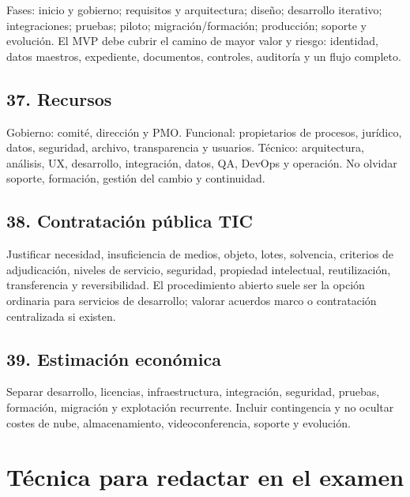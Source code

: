 \documentclass[11pt,a4paper]{article}
\begin{document}
Fases: inicio y gobierno; requisitos y arquitectura; diseño; desarrollo iterativo; integraciones; pruebas; piloto; migración/formación; producción; soporte y evolución. El MVP debe cubrir el camino de mayor valor y riesgo: identidad, datos maestros, expediente, documentos, controles, auditoría y un flujo completo.

\subsection{37. Recursos}

Gobierno: comité, dirección y PMO. Funcional: propietarios de procesos, jurídico, datos, seguridad, archivo, transparencia y usuarios. Técnico: arquitectura, análisis, UX, desarrollo, integración, datos, QA, DevOps y operación. No olvidar soporte, formación, gestión del cambio y continuidad.

\subsection{38. Contratación pública TIC}

Justificar necesidad, insuficiencia de medios, objeto, lotes, solvencia, criterios de adjudicación, niveles de servicio, seguridad, propiedad intelectual, reutilización, transferencia y reversibilidad. El procedimiento abierto suele ser la opción ordinaria para servicios de desarrollo; valorar acuerdos marco o contratación centralizada si existen.

\subsection{39. Estimación económica}

Separar desarrollo, licencias, infraestructura, integración, seguridad, pruebas, formación, migración y explotación recurrente. Incluir contingencia y no ocultar costes de nube, almacenamiento, videoconferencia, soporte y evolución.

\section{Técnica para redactar en el examen}
\end{document}
